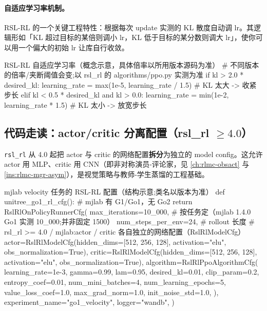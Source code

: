 \paragraph{自适应学习率机制。}RSL-RL 的一个关键工程特性：根据每次 update 实测的 KL 散度自动调 lr。其逻辑形如「KL 超过目标的某倍则调小 lr，KL 低于目标的某分数则调大 lr」，使你可以用一个偏大的初始 lr 让库自行收敛。

\begin{codebox}[Python]{RSL-RL 自适应学习率（概念示意，具体倍率以所用版本源码为准）}
# 不同版本的倍率/夹断阈值会变;以 rsl_rl 的 algorithms/ppo.py 实测为准
if kl > 2.0 * desired_kl:
    learning_rate = max(1e-5, learning_rate / 1.5)   # KL 太大 -> 收紧步长
elif kl < 0.5 * desired_kl and kl > 0.0:
    learning_rate = min(1e-2, learning_rate * 1.5)   # KL 太小 -> 放宽步长
\end{codebox}


\subsection{\texorpdfstring{代码走读：actor/critic 分离配置（rsl\_rl $\ge 4.0$）}{代码走读：actor/critic 分离配置（rsl\_rl >= 4.0）}}

\verb|rsl_rl| 从 4.0 起把 actor 与 critic 的网络配置\textbf{拆分}为独立的 model config。这允许 actor 用 MLP、critic 用 CNN（即非对称演员-评论家，见 \cref{ch:rlmc-obsact} 与 \cref{ins:rlmc-mgr-asym}），是视觉策略与教师-学生蒸馏的工程基础。

\begin{codebox}[Python]{mjlab velocity 任务的 RSL-RL 配置（结构示意;类名以版本为准）}
def unitree_go1_rl_cfg():                        # mjlab 有 G1/Go1，无 Go2
    return RslRlOnPolicyRunnerCfg(
        max_iterations=10_000,                  # 按任务定（mjlab 1.4.0 Go1 实测 10_000;并非固定 1500）
        num_steps_per_env=24,                   # rollout 长度
        # rsl_rl >= 4.0 / mjlab:actor / critic 各自独立的网络配置（RslRlModelCfg）
        actor=RslRlModelCfg(hidden_dims=[512, 256, 128], activation="elu",
                            obs_normalization=True),
        critic=RslRlModelCfg(hidden_dims=[512, 256, 128], activation="elu",
                             obs_normalization=True),
        algorithm=RslRlPpoAlgorithmCfg(
            learning_rate=1e-3, gamma=0.99, lam=0.95, desired_kl=0.01,
            clip_param=0.2, entropy_coef=0.01,
            num_mini_batches=4, num_learning_epochs=5,
            value_loss_coef=1.0, max_grad_norm=1.0, init_noise_std=1.0,
        ),
        experiment_name="go1_velocity", logger="wandb",
    )
\end{codebox}

